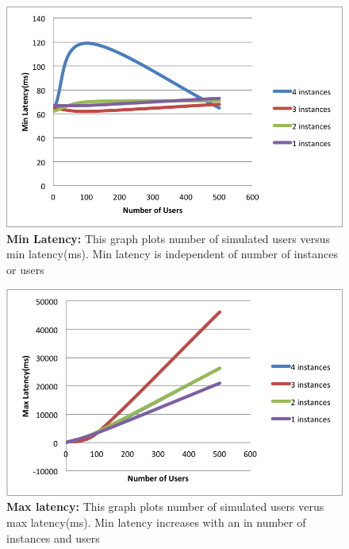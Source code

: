 \documentclass[12pt]{article}
\begin{document}
\begin{multicols}{2}
\begin{figure}[H] 
\centering
\includegraphics[scale=0.59]{Images/min_latency.PNG} 
\caption{\textbf{Min Latency:} This graph plots number of simulated users versus min latency(ms). 
Min latency is independent of number of instances or users} 
\label{fig:min_latency}
\end{figure} 

\begin{figure}[H] 
\centering
\includegraphics[scale=0.6355555]{Images/max_latency.PNG} \caption{\textbf{Max
latency:} This graph plots number of simulated users verus max latency(ms). Min latency 
increases with an in number of instances and users } 
\label{fig:max_latency} 
\end{figure} 
\end{multicols}
\end{document}
